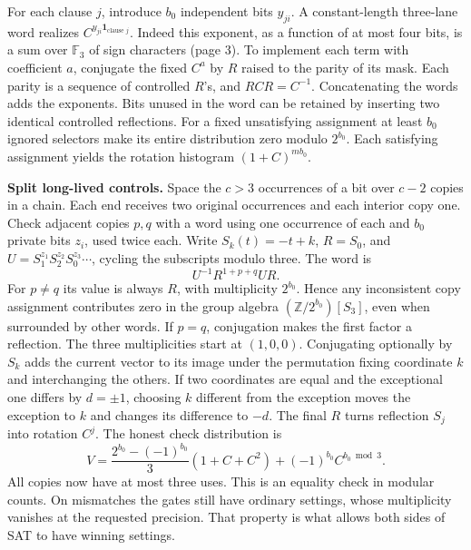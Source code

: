 \documentclass[11pt,letterpaper]{article}
\newcommand{\lab}[1]{\textbf{\color{navy}#1}\enspace}
\newcommand{\FF}{\mathbb F}\newcommand{\sat}{\mathop{\#\mathrm{SAT}}}\newcommand{\id}{\mathrm{id}}\newcommand{\pf}{\operatorname{Pf}}
\begin{document}
For each clause $j$, introduce $b_0$ independent bits $y_{ji}$. A constant-length three-lane word realizes $C^{y_{ji}\mathbf1_{\text{clause }j}}$. Indeed this exponent, as a function of at most four bits, is a sum over $\FF_3$ of sign characters (page 3). To implement each term with coefficient $a$, conjugate the fixed $C^a$ by $R$ raised to the parity of its mask. Each parity is a sequence of controlled $R$'s, and $RCR=C^{-1}$. Concatenating the words adds the exponents. Bits unused in the word can be retained by inserting two identical controlled reflections. For a fixed unsatisfying assignment at least $b_0$ ignored selectors make its entire distribution zero modulo $2^{b_0}$. Each satisfying assignment yields the rotation histogram $(1+C)^{mb_0}$.

\lab{Split long-lived controls.} Space the $c>3$ occurrences of a bit over $c-2$ copies in a chain. Each end receives two original occurrences and each interior copy one. Check adjacent copies $p,q$ with a word using one occurrence of each and $b_0$ private bits $z_i$, used twice each. Write $S_k(t)=-t+k$, $R=S_0$, and $U=S_1^{z_1}S_2^{z_2}S_0^{z_3}\cdots$, cycling the subscripts modulo three. The word is
\[
                        U^{-1}R^{1+p+q}UR.
\]
For $p\ne q$ its value is always $R$, with multiplicity $2^{b_0}$. Hence any inconsistent copy assignment contributes zero in the group algebra $(\mathbb Z/2^{b_0})[S_3]$, even when surrounded by other words. If $p=q$, conjugation makes the first factor a reflection. The three multiplicities start at $(1,0,0)$. Conjugating optionally by $S_k$ adds the current vector to its image under the permutation fixing coordinate $k$ and interchanging the others. If two coordinates are equal and the exceptional one differs by $d=\pm1$, choosing $k$ different from the exception moves the exception to $k$ and changes its difference to $-d$. The final $R$ turns reflection $S_j$ into rotation $C^j$. The honest check distribution is
\[
           V=\frac{2^{b_0}-(-1)^{b_0}}3(1+C+C^2)+(-1)^{b_0}C^{b_0\bmod3}.
\]
All copies now have at most three uses. This is an equality check in modular counts. On mismatches the gates still have ordinary settings, whose multiplicity vanishes at the requested precision. That property is what allows both sides of SAT to have winning settings.
\end{document}
